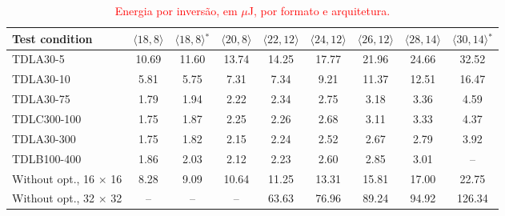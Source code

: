 \begin{table}[htbp]
\caption{\textcolor{red}{Energia por inversão, em $\mu$J, por formato e arquitetura.}}
\label{tab:energia-inversao}
\vspace{4pt} %
\centering
\footnotesize
\color{red}
\renewcommand{\arraystretch}{1.2}
\setlength{\tabcolsep}{3pt}
\begin{tabular}{lcccccccc}
\toprule
\textbf{Test condition} & \textbf{$\langle 18,8\rangle$} & \textbf{$\langle 18,8\rangle$$^{*}$} & \textbf{$\langle 20,8\rangle$} & \textbf{$\langle 22,12\rangle$} & \textbf{$\langle 24,12\rangle$} & \textbf{$\langle 26,12\rangle$} & \textbf{$\langle 28,14\rangle$} & \textbf{$\langle 30,14\rangle$$^{*}$} \\
\midrule
TDLA30-5 & 10.69 & 11.60 & 13.74 & 14.25 & 17.77 & 21.96 & 24.66 & 32.52 \\
TDLA30-10 & 5.81 & 5.75 & 7.31 & 7.34 & 9.21 & 11.37 & 12.51 & 16.47 \\
TDLA30-75 & 1.79 & 1.94 & 2.22 & 2.34 & 2.75 & 3.18 & 3.36 & 4.59 \\
TDLC300-100 & 1.75 & 1.87 & 2.25 & 2.26 & 2.68 & 3.11 & 3.33 & 4.37 \\
TDLA30-300 & 1.75 & 1.82 & 2.15 & 2.24 & 2.52 & 2.67 & 2.79 & 3.92 \\
TDLB100-400 & 1.86 & 2.03 & 2.12 & 2.23 & 2.60 & 2.85 & 3.01 & -- \\
\midrule
Without opt., 16 $\times$ 16 & 8.28 & 9.09 & 10.64 & 11.25 & 13.31 & 15.81 & 17.00 & 22.75 \\
Without opt., 32 $\times$ 32 & -- & -- & -- & 63.63 & 76.96 & 89.24 & 94.92 & 126.34 \\
\bottomrule
\end{tabular}
\vspace{4pt}
\end{table}
